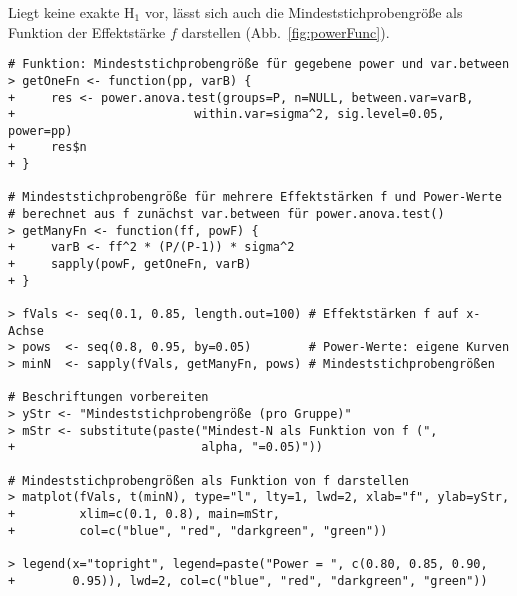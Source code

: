 Liegt keine exakte $\text{H}_{1}$ vor, lässt sich auch die Mindeststichprobengröße als Funktion der Effektstärke $f$ darstellen (Abb.\ \ref{fig:powerFunc}).
\begin{lstlisting}
# Funktion: Mindeststichprobengröße für gegebene power und var.between
> getOneFn <- function(pp, varB) {
+     res <- power.anova.test(groups=P, n=NULL, between.var=varB,
+                         within.var=sigma^2, sig.level=0.05, power=pp)
+     res$n
+ }

# Mindeststichprobengröße für mehrere Effektstärken f und Power-Werte
# berechnet aus f zunächst var.between für power.anova.test()
> getManyFn <- function(ff, powF) {
+     varB <- ff^2 * (P/(P-1)) * sigma^2
+     sapply(powF, getOneFn, varB)
+ }

> fVals <- seq(0.1, 0.85, length.out=100) # Effektstärken f auf x-Achse
> pows  <- seq(0.8, 0.95, by=0.05)        # Power-Werte: eigene Kurven
> minN  <- sapply(fVals, getManyFn, pows) # Mindeststichprobengrößen

# Beschriftungen vorbereiten
> yStr <- "Mindeststichprobengröße (pro Gruppe)"
> mStr <- substitute(paste("Mindest-N als Funktion von f (",
+                          alpha, "=0.05)"))

# Mindeststichprobengrößen als Funktion von f darstellen
> matplot(fVals, t(minN), type="l", lty=1, lwd=2, xlab="f", ylab=yStr,
+         xlim=c(0.1, 0.8), main=mStr,
+         col=c("blue", "red", "darkgreen", "green"))

> legend(x="topright", legend=paste("Power = ", c(0.80, 0.85, 0.90,
+        0.95)), lwd=2, col=c("blue", "red", "darkgreen", "green"))
\end{lstlisting}
